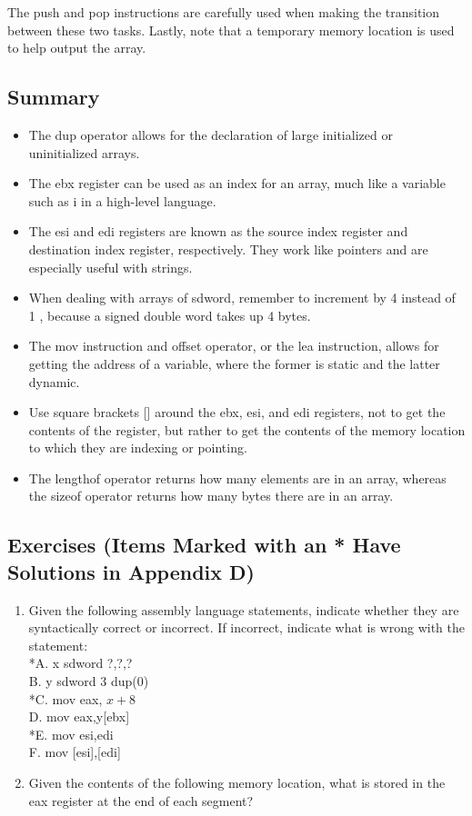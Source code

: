 \documentclass[10pt]{article}
\begin{document}
The push and pop instructions are carefully used when making the transition between these two tasks. Lastly, note that a temporary memory location is used to help output the array.

\subsection*{Summary}
\begin{itemize}
  \item The dup operator allows for the declaration of large initialized or uninitialized arrays.
  \item The ebx register can be used as an index for an array, much like a variable such as i in a high-level language.
  \item The esi and edi registers are known as the source index register and destination index register, respectively. They work like pointers and are especially useful with strings.
  \item When dealing with arrays of sdword, remember to increment by 4 instead of 1 , because a signed double word takes up 4 bytes.
  \item The mov instruction and offset operator, or the lea instruction, allows for getting the address of a variable, where the former is static and the latter dynamic.
  \item Use square brackets [] around the ebx, esi, and edi registers, not to get the contents of the register, but rather to get the contents of the memory location to which they are indexing or pointing.
  \item The lengthof operator returns how many elements are in an array, whereas the sizeof operator returns how many bytes there are in an array.
\end{itemize}

\subsection*{Exercises (Items Marked with an * Have Solutions in Appendix D)}
\begin{enumerate}
  \item Given the following assembly language statements, indicate whether they are syntactically correct or incorrect. If incorrect, indicate what is wrong with the statement:\\
*A. x sdword ?,?,?\\
B. y sdword 3 dup(0)\\
*C. mov eax, $x+8$\\[0pt]
D. mov eax,y[ebx]\\
*E. mov esi,edi\\[0pt]
F. mov [esi],[edi]
  \item Given the contents of the following memory location, what is stored in the eax register at the end of each segment?
\end{enumerate}
\end{document}
